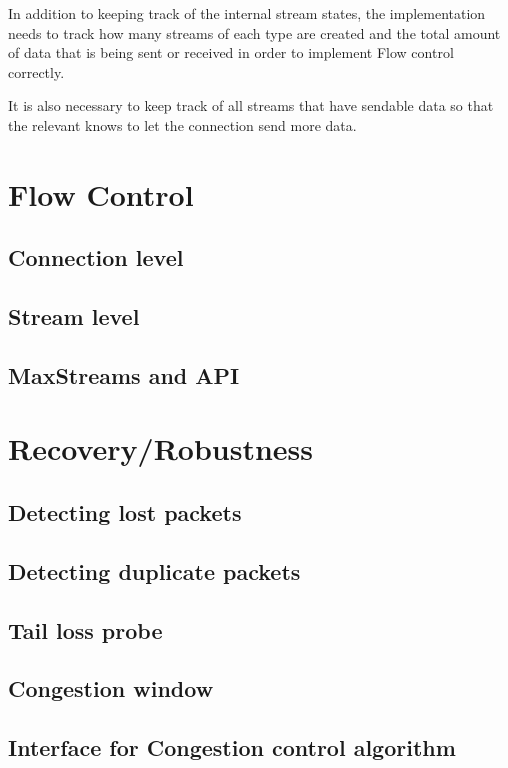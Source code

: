 In addition to keeping track of the internal stream states, the \QuicConnection{} implementation
needs to track how many streams of each type are created and the total amount of data that is being
sent or received in order to implement Flow control correctly.

It is also necessary to keep track of all streams that have sendable data so that the relevant
\QuicSocketContext{} knows to let the connection send more data.

\section{Flow Control}

\subsection{Connection level}
\subsection{Stream level}
\subsection{MaxStreams and API}

\section{Recovery/Robustness}

\subsection{Detecting lost packets}
\subsection{Detecting duplicate packets}
\subsection{Tail loss probe}
\subsection{Congestion window}
\subsection{Interface for Congestion control algorithm}

